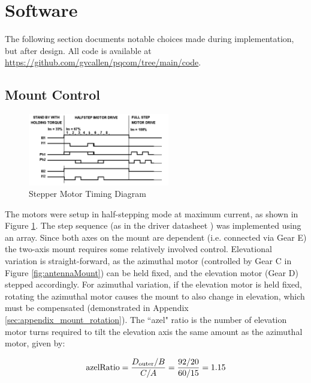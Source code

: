 \graphicspath{{./figures}}

\section{Software}
The following section documents notable choices made during implementation, but after design. All code is available at \url{https://github.com/gvcallen/pqcom/tree/main/code}.

\subsection{Mount Control}
\begin{figure}[!htb]
  \centering
  \includegraphics[width=0.55\textwidth]{stepperTiming}
  \caption{Stepper Motor Timing Diagram \cite{datasheet-L6219}}
  \label{fig:stepperTiming}
\end{figure}

The motors were setup in half-stepping mode at maximum current, as shown in Figure \ref{fig:stepperTiming}. The step sequence (as in the driver datasheet \cite{datasheet-L6219}) was implemented using an array. Since both axes on the mount are dependent (i.e. connected via Gear E) the two-axis mount requires some relatively involved control. Elevational variation is straight-forward, as the azimuthal motor (controlled by Gear C in Figure \ref{fig:antennaMount}) can be held fixed, and the elevation motor (Gear D) stepped accordingly. For azimuthal variation, if the elevation motor is held fixed, rotating the azimuthal motor causes the mount to also change in elevation, which must be compensated (demonstrated in Appendix \ref{sec:appendix_mount_rotation}). The ``azel" ratio is the number of elevation motor turns required to tilt the elevation axis the same amount as the azimuthal motor, given by:

\begin{equation}\label{eqn:azelRatio}
\textnormal{azelRatio} = \frac{D_{\textnormal{outer}} / B}{C / A} = \frac{92 / 20}{60 / 15} = 1.15
\end{equation}

